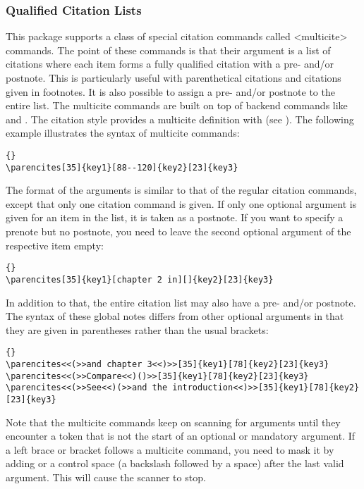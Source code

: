 \documentclass{ltxdockit}[2011/03/25]
\begin{document}
\subsubsection{Qualified Citation Lists}
\label{use:cit:mlt}

This package supports a class of special citation commands called <multicite> commands. The point of these commands is that their argument is a list of citations where each item forms a fully qualified citation with a pre- and\slash or postnote. This is particularly useful with parenthetical citations and citations given in footnotes. It is also possible to assign a pre- and\slash or postnote to the entire list. The multicite commands are built on top of backend commands like  and . The citation style provides a multicite definition with  (see ). The following example illustrates the syntax of multicite commands:

\begin{lstlisting}[style=latex]{}
\parencites[35]{key1}[88--120]{key2}[23]{key3}
\end{lstlisting}
%
The format of the arguments is similar to that of the regular citation commands, except that only one citation command is given. If only one optional argument is given for an item in the list, it is taken as a postnote. If you want to specify a prenote but no postnote, you need to leave the second optional argument of the respective item empty:

\begin{lstlisting}[style=latex]{}
\parencites[35]{key1}[chapter 2 in][]{key2}[23]{key3}
\end{lstlisting}
%
In addition to that, the entire citation list may also have a pre- and\slash or postnote. The syntax of these global notes differs from other optional arguments in that they are given in parentheses rather than the usual brackets:

\begin{lstlisting}[style=latex]{}
\parencites<<(>>and chapter 3<<)>>[35]{key1}[78]{key2}[23]{key3}
\parencites<<(>>Compare<<)()>>[35]{key1}[78]{key2}[23]{key3}
\parencites<<(>>See<<)(>>and the introduction<<)>>[35]{key1}[78]{key2}[23]{key3}
\end{lstlisting}
%
Note that the multicite commands keep on scanning for arguments until they encounter a token that is not the start of an optional or mandatory argument. If a left brace or bracket follows a multicite command, you need to mask it by adding  or a control space (a backslash followed by a space) after the last valid argument. This will cause the scanner to stop.
\end{document}

